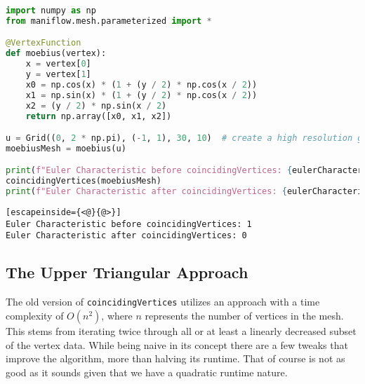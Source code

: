 \begin{lstlisting}[language=Python, caption={Euler Characteristic of the moebius strip with and without \texttt{coincidingVertices}}, label={lst:coincidingVertice_eulers}]
import numpy as np
from maniflow.mesh.parameterized import *

@VertexFunction
def moebius(vertex):
    x = vertex[0]
    y = vertex[1]
    x0 = np.cos(x) * (1 + (y / 2) * np.cos(x / 2))
    x1 = np.sin(x) * (1 + (y / 2) * np.cos(x / 2))
    x2 = (y / 2) * np.sin(x / 2)
    return np.array([x0, x1, x2])

u = Grid((0, 2 * np.pi), (-1, 1), 30, 10)  # create a high resolution grid
moebiusMesh = moebius(u)

print(f"Euler Characteristic before coincidingVertices: {eulerCharacteristic(moebiusMesh)}")
coincidingVertices(moebiusMesh)
print(f"Euler Characteristic after coincidingVertices: {eulerCharacteristic(moebiusMesh)}")
\end{lstlisting}

\begin{lstlisting}[escapeinside={<@}{@>}]
Euler Characteristic before coincidingVertices: 1
Euler Characteristic after coincidingVertices: 0
\end{lstlisting}

\subsection{The Upper Triangular Approach}
The old version of \texttt{coincidingVertices} utilizes an approach with a time complexity of $O(n^2)$, where $n$ represents the number of vertices in the mesh. This stems from iterating twice through all or at least a linearly decreased subset of the vertex data. While being naive in its concept there are a few tweaks that improve the algorithm, more than halving its runtime. That of course is not as good as it sounds given that we have a quadratic runtime nature.

